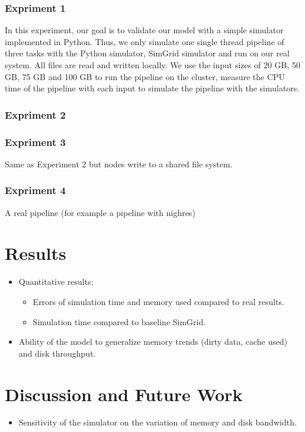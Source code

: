 \documentclass[conference]{IEEEtran}
\begin{document}
			\subsubsection{Expriment 1}

				In this experiment, our goal is to validate our model with a simple simulator implemented in Python. Thus, we only simulate one single thread pipeline of three tasks with the Python simulator, SimGrid simulator and run on our real system. All files are read and written locally. We use the input sizes of 20 GB, 50 GB, 75 GB and 100 GB to run the pipeline on the cluster, measure the CPU time of the pipeline with each input to simulate the pipeline with the simulators.

			\subsubsection{Expriment 2}

				

			\subsubsection{Expriment 3}
				Same as Experiment 2 but nodes write to a shared file system.
			\subsubsection{Expriment 4}
				A real pipeline (for example a pipeline with nighres)

	\section{Results}
	
		\begin{itemize}

			\item Quantitative results: 
				\begin{itemize}
					\item Errors of simulation time and memory used compared to real results.
					\item Simulation time compared to baseline SimGrid.
				\end{itemize} 

			\item Ability of the model to generalize memory trends (dirty data, cache used) and disk throughput.

		\end{itemize}

	\section{Discussion and Future Work}
		\begin{itemize}
			\item Sensitivity of the simulator on the variation of memory and disk bandwidth. 
		\end{itemize}


\end{document}
